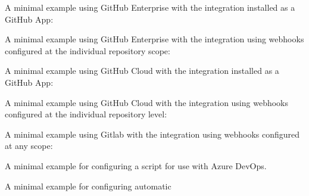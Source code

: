 \pagebreak
A minimal example using GitHub Enterprise with the \cxoneflow integration installed
as a GitHub App:

  
  
\pagebreak
A minimal example using GitHub Enterprise with the \cxoneflow integration using
webhooks configured at the individual repository scope:





\pagebreak
A minimal example using GitHub Cloud with the \cxoneflow integration installed
as a GitHub App:


  
  
\pagebreak
A minimal example using GitHub Cloud with the \cxoneflow integration using
webhooks configured at the individual repository level:


\pagebreak
A minimal example using Gitlab with the \cxoneflow integration using
webhooks configured at any scope:



\pagebreak
A minimal example for configuring a  script
for use with Azure DevOps.



\pagebreak
A minimal example for configuring automatic 

